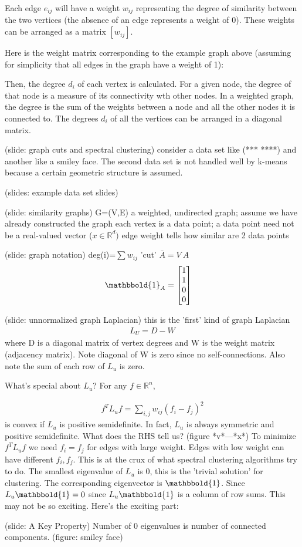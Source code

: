 \documentclass[11pt]{article}
\begin{document}
Each edge $e_{ij}$ will have a weight $w_{ij}$ representing the degree of similarity between the two vertices (the absence of an edge represents a weight of 0).  These weights can be arranged as a matrix $[w_{ij}]$.

Here is the weight matrix corresponding to the example graph above (assuming for simplicity that all edges in the graph have a weight of 1):

Then, the degree $d_i$ of each vertex is calculated.  For a given node, the degree of that node is a measure of its connectivity wth other nodes.  In a weighted graph, the degree is the sum of the weights between a node and all the other nodes it is connected to.  The degrees $d_i$ of all the vertices can be arranged in a diagonal matrix.


(slide: graph cuts and spectral clustering)
consider a data set like (***    ****) and another like a smiley face.  The second data set is not handled well by k-means because a certain geometric structure is assumed.

(slides: example data set slides)

(slide: similarity graphs)
G=(V,E) a weighted, undirected graph; assume we have already constructed the graph
each vertex is a data point; a data point need not be a real-valued vector ($x \in \mathbb{R}^d)$
edge weight tells how similar are 2 data points

(slide: graph notation)
deg(i)=$\sum w_{ij}$
'cut' $\bar{A}=V \ A$
\begin{align*}
\mathbbold{1}_A &= \begin{bmatrix}
 1 \\
 1 \\
 0 \\
 0
\end{bmatrix}
\end{align*}

(slide: unnormalized graph Laplacian)
this is the 'first' kind of graph Laplacian
\begin{align}
L_U = D - W
\end{align}
where D is a diagonal matrix of vertex degrees and W is the weight matrix (adjacency matrix).  Note diagonal of W is zero since no self-connections.  Also note the sum of each row of $L_u$ is zero.

What's special about $L_u$?
For any $f \in \mathbb{R}^n$, 

\begin{align}
f^TL_uf=\sum_{i,j}w_{ij}(f_i-f_j)^2
\end{align}
is convex if $L_u$ is positive semidefinite.  In fact, $L_u$ is always symmetric and positive semidefinite.  What does the RHS tell us?  (figure *v*---*x*) To minimize $f^TL_uf$ we need $f_i=f_j$ for edges with large weight.  Edges with low weight can have different $f_i,f_j$.  This is at the crux of what spectral clustering algorithms try to do.  The smallest eigenvalue of $L_u$ is 0, this is the 'trivial solution' for clustering.  The corresponding eigenvector is $\mathbbold{1}$.  Since $L_u\mathbbold{1}=0$ since $L_u\mathbbold{1}$ is a column of row sums.  This may not be so exciting.  Here's the exciting part:

(slide: A Key Property)
Number of 0 eigenvalues is number of connected components.  (figure: smiley face)
%
%
\end{document}
